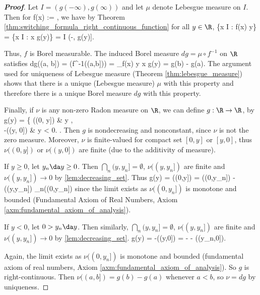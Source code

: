 \begin{proof}[\bf Proof]%
Let $I = (g(-\infty), g(\infty))$ and let $\mu$ denote Lebesgue measure on $I$. Then for
\be
f(x) := \inf{},
\ee
we have by Theorem \ref{thm:switching_formula_right_continuous_function} for all $y \in \R$,
\be
\{x \in I : f(x) \leq y\} = \{x \in I : x \leq g(y)\} = I \cap (-\infty, g(y)].
\ee

Thus, $f$ is Borel measurable. The induced Borel measure $dg = \mu\circ f^{-1}$ on $\R$ satisfies
\be
dg((a, b]) = \mu(f^{-1}((a,b])) = \underbrace{\mu\brb{\{x : f(x) > a \text{ and }f(x) \leq b\}} = \mu\brb{(g(a), g(b)]} }_{f(x) \leq y x \leq g(y)} = g(b) - g(a).
\ee
The argument used for uniqueness of Lebesgue measure (Theorem \ref{thm:lebesgue_measure}) shows that there is a unique (Lebesgue measure) $\mu$ with this property and therefore there is a unique Borel measure $dg$ with this property.

Finally, if $\nu$ is any non-zero Radon measure on $\R$, we can define $g : \R \to \R$, by
\be
g(y) = \left\{
\nu((0, y]) & y ,\\
-\nu((y, 0]) \quad\quad & y < 0.
\ea\right.
\ee
Then $g$ is nondecreasing and nonconstant, since $\nu$ is not the zero measure. Moreover, $\nu$ is finite-valued for compact set $[0,y]$ or $[y,0]$, thus $\nu((0,y])$ or $\nu((y,0])$ are finite (due to the additivity of measure).

If $y\geq 0$, let $y_n \da y \geq 0$. Then $\bigcap_n(y,y_n] = \emptyset$, $\nu((y,y_n])$ are finite and $\nu((y,y_n]) \to 0$ by \ref{lem:decreasing_set}. Thus
\be
g(y) = \nu((0,y]) = \nu((0,y_n]) - \nu((y,y_n]) \to \lim_{n\to \infty}\nu((0,y_n])
\ee
since the limit exists as $\nu((0,y_n])$ is monotone and bounded (Fundamental Axiom of Real Numbers, Axiom \ref{axm:fundamental_axiom_of_analysis}).

If $y<0$, let $0 >y_n\da y$. Then similarly, $\bigcap_n(y,y_n] = \emptyset$, $\nu((y,y_n])$ are finite and $\nu((y,y_n]) \to 0$ by \ref{lem:decreasing_set}.
\be
g(y) = -\nu((y,0]) = -\brb{\nu((y,y_n])+ \nu((y_n,0])} \to - \lim\nu((y_n,0]).
\ee

Again, the limit exists as $\nu((0,y_n])$ is monotone and bounded (fundamental axiom of real numbers, Axiom \ref{axm:fundamental_axiom_of_analysis}). So $g$ is right-continuous. Then $\nu((a, b]) = g(b)-g(a)$ whenever $a < b$, so $\nu = dg$ by uniqueness.
\end{proof}

